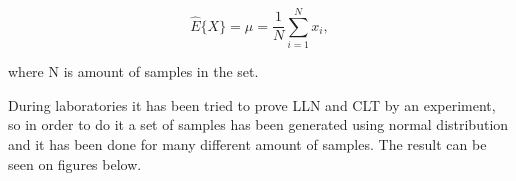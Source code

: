 \documentclass[11pt]{article}
\begin{document}
	$$\hat{E}\{X\}=\mu=\frac{1}{N}\sum_{i=1}^{N}x_{i},$$
	
	where N is amount of samples in the set.
	
	During laboratories it has been tried to prove LLN and CLT by an experiment,
	so in order to do it a set of samples has been generated using normal
	distribution and it has been done for many different amount of samples.
	The result can be seen on figures below.
	
	
\end{document}
